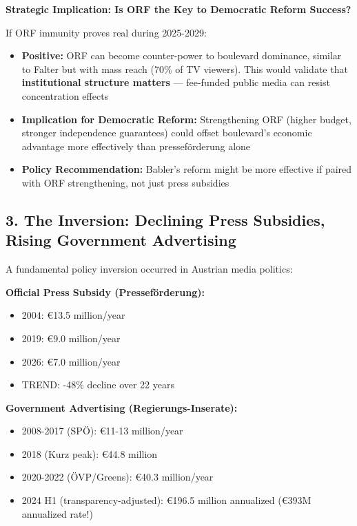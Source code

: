 \textbf{Strategic Implication: Is ORF the Key to Democratic Reform Success?}

If ORF immunity proves real during 2025-2029:

\begin{itemize}
\item \textbf{Positive:} ORF can become counter-power to boulevard dominance, similar to Falter but with
  mass reach (70\% of TV viewers). This would validate that \textbf{institutional structure matters} —
  fee-funded public media can resist concentration effects
\item \textbf{Implication for Democratic Reform:} Strengthening ORF (higher budget, stronger independence
  guarantees) could offset boulevard's economic advantage more effectively than presseförderung alone
\item \textbf{Policy Recommendation:} Babler's reform might be more effective if paired with ORF strengthening,
  not just press subsidies
\end{itemize}

\label{sec:dx-press-subsidy}

\subsection*{3. The Inversion: Declining Press Subsidies, Rising Government Advertising}

A fundamental policy inversion occurred in Austrian media politics:

\textbf{Official Press Subsidy (Presseförderung):}
\begin{itemize}
\item 2004: €13.5 million/year
\item 2019: €9.0 million/year
\item 2026: €7.0 million/year
\item TREND: -48\% decline over 22 years
\end{itemize}

\textbf{Government Advertising (Regierungs-Inserate):}
\begin{itemize}
\item 2008-2017 (SPÖ): €11-13 million/year
\item 2018 (Kurz peak): €44.8 million
\item 2020-2022 (ÖVP/Greens): €40.3 million/year
\item 2024 H1 (transparency-adjusted): €196.5 million annualized (€393M annualized rate!)
\end{itemize}

